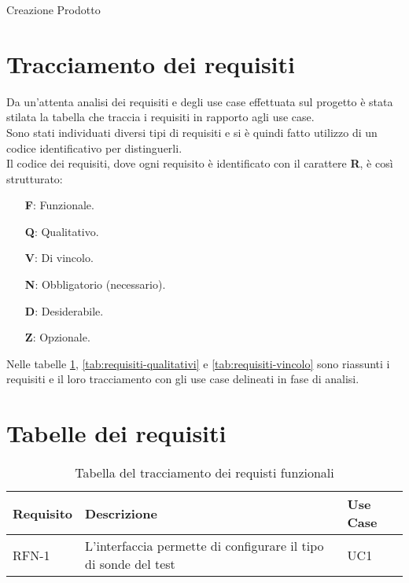\begin{usecase}{2}{Creazione Prodotto}
\end{usecase}

\section{Tracciamento dei requisiti}

Da un'attenta analisi dei requisiti e degli use case effettuata sul progetto è stata stilata la tabella che traccia i requisiti in rapporto agli use case.\\
Sono stati individuati diversi tipi di requisiti e si è quindi fatto utilizzo di un codice identificativo per distinguerli.\\
Il codice dei requisiti, dove ogni requisito è identificato con il carattere \textbf{R}, è così strutturato:

\begin{enumerate}
    \item[\textbf{F}:] Funzionale.
    \item[\textbf{Q}:] Qualitativo.
    \item[\textbf{V}:] Di vincolo.
    \item[\textbf{N}:] Obbligatorio (necessario).
    \item[\textbf{D}:] Desiderabile.
    \item[\textbf{Z}:] Opzionale.
\end{enumerate}

Nelle tabelle \ref{tab:requisiti-funzionali}, \ref{tab:requisiti-qualitativi} e \ref{tab:requisiti-vincolo} sono riassunti i requisiti e il loro tracciamento con gli use case delineati in fase di analisi.

\section{Tabelle dei requisiti}

\begin{table}[h]
\begin{tabularx}{\textwidth}{lXl}
\hline
    \textbf{Requisito} & \textbf{Descrizione} & \textbf{Use Case}\\
    \hline
    RFN-1 & L'interfaccia permette di configurare il tipo di sonde del test & UC1\\
\hline
\end{tabularx}
\vspace{4pt}
\caption{Tabella del tracciamento dei requisti funzionali}
\label{tab:requisiti-funzionali}
\end{table}

